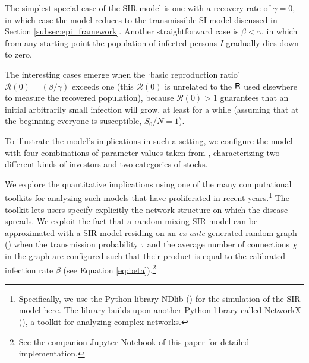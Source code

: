 The simplest special case of the SIR model is one with a recovery rate of $\gamma=0$, in which case the model reduces to the transmissible SI model discussed in Section \ref{subsec:epi_framework}.  Another straightforward case is $\beta < \gamma$, in which from any starting point the population of infected persons $I$ gradually dies down to zero.

\newcommand{\Rzero}{\mathcal{R}(0)}
The interesting cases emerge when the `basic reproduction ratio' $\Rzero = (\beta/\gamma)$ exceeds one (this $\Rzero$ is unrelated to the $\mathsf{R}$ used elsewhere to measure the recovered population), because $\Rzero > 1$ guarantees that an initial arbitrarily small infection will grow, at least for a while (assuming that at the beginning everyone is susceptible, $S_{0}/N = 1$).

To illustrate the model's implications in such a setting, we configure the model with four combinations of parameter values taken from \cite{shiller1989survey}, characterizing two different kinds of investors and two categories of stocks.  %

We explore the quantitative implications using one of the many computational toolkits for analyzing such models that have proliferated in recent years.\footnote{Specifically, we use the Python library NDlib (\cite{rossetti2018ndlib}) for the simulation of the SIR model here. The library builds upon another Python library called NetworkX (\cite{hagberg2008exploring}), a toolkit for analyzing complex networks.}  The toolkit lets users specify explicitly the network structure on which the disease spreads. We exploit the fact that a random-mixing SIR model can be approximated with a SIR model residing on an \textit{ex-ante} generated random graph (\cite{erdos1960evolution}) when the transmission probability $\tau$ and the average number of connections $\chi$ in the graph are configured such that their product is equal to the calibrated infection rate $\beta$ (see Equation \ref{eq:beta}).\footnote{See the companion \href{https://github.com/llorracc/EpiExp/blob/master/SIR_Ndlib.ipynb}{Jupyter Notebook} of this paper for detailed implementation.}

